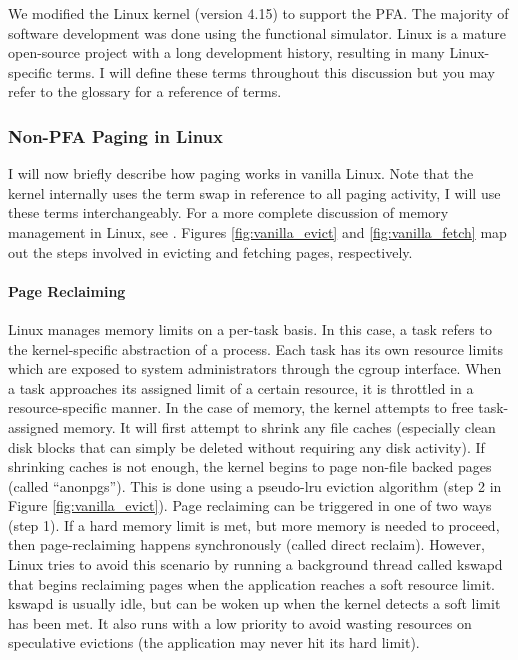 We modified the Linux kernel (version 4.15\cite{linux}) to support the PFA. The
majority of software development was done using the functional simulator. Linux
is a mature open-source project with a long development history, resulting in
many Linux-specific terms. I will define these terms throughout this discussion
but you may refer to the glossary for a reference of terms.

\subsubsection{Non-PFA Paging in Linux} \label{sec:vanillaLinux}
I will now briefly describe how paging works in vanilla Linux. Note that the
kernel internally uses the term \gls{swap} in reference to all paging activity,
I will use these terms interchangeably. For a more complete discussion of
memory management in Linux, see \cite{linuxBook}. Figures
\ref{fig:vanilla_evict} and \ref{fig:vanilla_fetch} map out the steps involved
in evicting and fetching pages, respectively.

\paragraph{Page Reclaiming}
Linux manages memory limits on a per-task basis. In this case, a \gls{task}
refers to the kernel-specific abstraction of a process. Each task has its own
resource limits which are exposed to system administrators through the
\gls{cgroup} interface. When a task approaches its assigned limit of a certain
resource, it is throttled in a resource-specific manner. In the case of memory,
the kernel attempts to free task-assigned memory. It will first attempt to
shrink any file caches (especially clean disk blocks that can simply be deleted
without requiring any disk activity). If shrinking caches is not enough, the
kernel begins to page non-file backed pages (called ``\glspl{anonpg}''). This
is done using a pseudo-\gls{lru} eviction algorithm (step 2 in Figure
\ref{fig:vanilla_evict}). Page reclaiming can be triggered
in one of two ways (step 1). If a hard memory limit is met, but more memory is needed to
proceed, then page-reclaiming happens synchronously (called direct reclaim).
However, Linux tries to avoid this scenario by running a background thread
called \gls{kswapd} that begins reclaiming pages when the application reaches a
soft resource limit. \Gls{kswapd} is usually idle, but can be woken up when the
kernel detects a soft limit has been met. It also runs with a low priority to
avoid wasting resources on speculative evictions (the application may never hit
its hard limit).

